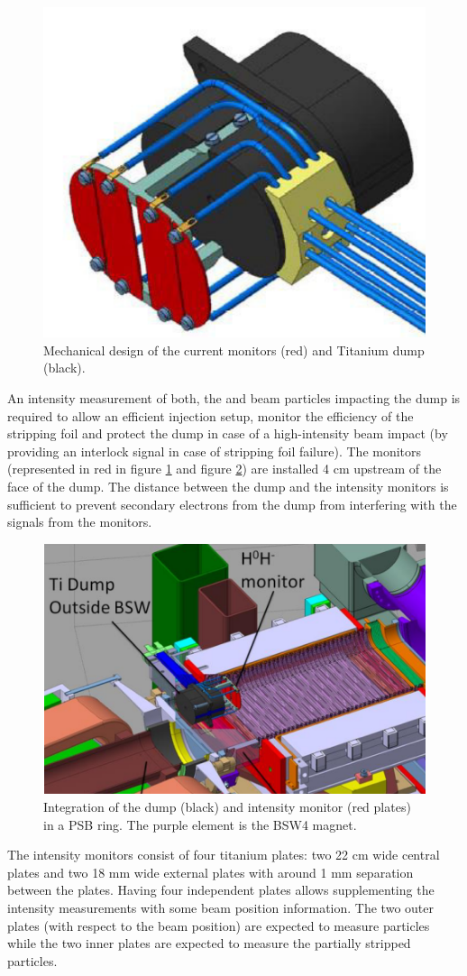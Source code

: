 \begin{figure}[h]
    \centering
    \includegraphics[width=0.45\columnwidth]{Figure_H0H-Monitpor/H0H-.png}
    \caption{Mechanical design of the \hzhm current monitors (red) and Titanium dump (black).}
    \label{fig:H0H-dump}
\end{figure}

An intensity measurement of both, the \hzz and \hm beam particles impacting the dump is required to allow an efficient injection setup, monitor the efficiency of the stripping foil and protect the dump in case of a high-intensity beam impact (by providing an interlock signal in case of stripping foil failure). The \hzhm monitors (represented in red in figure \ref{fig:H0H-dump} and figure \ref{fig:H0H-Loc}) are installed 4 cm upstream of the face of the dump. The distance between the dump and the intensity monitors is sufficient to prevent secondary electrons from the dump from interfering with the signals from the monitors.

\begin{figure}[h]
    \centering
    \includegraphics[width=0.6\columnwidth]{Figure_H0H-Monitpor/Instalation.png}
    \caption{Integration of the \hzhm dump (black) and intensity monitor (red plates) in a PSB ring. The purple element is the BSW4 magnet.}
    \label{fig:H0H-Loc}
\end{figure}

The \hzhm intensity monitors consist of four titanium plates: two 22 cm wide central plates and two 18 mm wide external plates with around 1 mm separation between the plates. Having four independent plates allows supplementing the intensity measurements with some beam position information. The two outer plates (with respect to the beam position) are expected to measure \hm particles while the two inner plates are expected to measure the partially stripped \hzz particles. 

